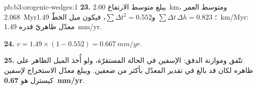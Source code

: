 \begin{solution}{pb:b3:orogenic-wedges:1}
\textbf{23.} يبلغ متوسط الارتفاع \qty{2.00}{km}، ومتوسط العمر
\qty{2.068}{Myr}؛ $\sum\Delta t\,\Delta h = 0.823$ و$\sum\Delta t^2 =
0.552$، فيكون ميل الخطّ \qty{1.49}{km/Myr}: معدّل ظاهريّ قدره
\qty{1.49}{mm/yr}.

\textbf{24.} $v = 1.49\times(1 - 0.552) = \qty{0.667}{mm/yr}$.

\textbf{25.} تتّفق  وموازنة الدفق: الإسفين
في الحالة المستقرّة، ولو أُخذ الميل الظاهر على ظاهره لكان قد بالغ في تقدير المعدّل
بأكثر من ضعفين. ويبلغ معدّل الاستخراج لإسفين كيسترل
هو \textbf{\qty[text-series-to-math=true]{0.67}{mm/yr}}.
\end{solution}
